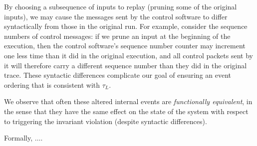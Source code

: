 By choosing a subsequence of inputs to replay (pruning some of the original inputs),
we may cause the messages sent by the control software to differ syntactically
from those in the original run. For example, consider the sequence numbers of control
messages: if we prune an input at the beginning of the execution, then the
control software's sequence number counter may increment one less time than it
did in the original execution, and all
control packets sent by it will therefore carry a different sequence number
than they did in the original trace. These syntactic differences complicate
our goal of ensuring an event ordering that is consistent with $\tau_L$.

We observe that often these altered internal events are {\em functionally
equivalent}, in the sense that they
have the same effect on the state of the system with respect to triggering the
invariant violation (despite syntactic differences).

Formally, $\dots$.
